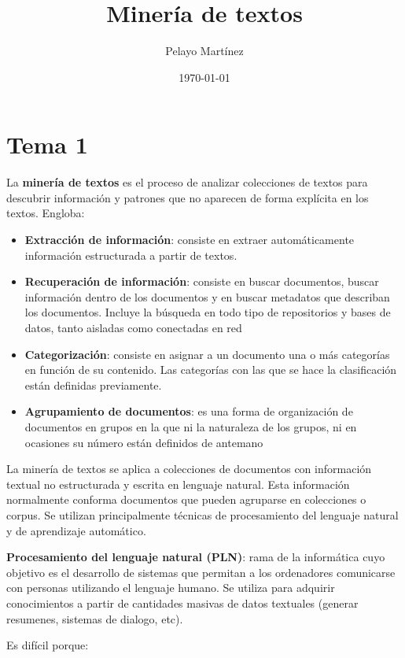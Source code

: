 \documentclass{ctexart}
\title{Minería de textos} %
\author{Pelayo Martínez} %
\date{\today} %
\begin{document}

	\maketitle %
    
	\section{Tema 1}
    La \textbf{minería de textos} es el proceso de analizar colecciones de textos para descubrir información y patrones que no aparecen de forma explícita en los textos.
    Engloba: 
	\begin{itemize}
	\item   \textbf{Extracción de información}: consiste en extraer automáticamente información estructurada a partir de textos.
	\item   \textbf{Recuperación de información}: consiste en buscar documentos, buscar información dentro de los documentos y en buscar metadatos que describan los documentos. Incluye la búsqueda en todo tipo de repositorios y bases de datos, tanto aisladas como conectadas en red
	\item   \textbf{Categorización}: consiste en asignar a un documento una o más categorías en función de su contenido. Las categorías con las que se hace la clasificación están definidas previamente.
	\item   \textbf{Agrupamiento de documentos}: es una forma de organización de documentos en grupos en la que ni la naturaleza de los grupos, ni en ocasiones su número están definidos de antemano
	\end{itemize}
		
	\begin{flushleft}
	La minería de textos se aplica a colecciones de documentos con información textual no estructurada y escrita en lenguaje natural. Esta información normalmente conforma documentos que pueden agruparse en colecciones o corpus.  Se utilizan principalmente técnicas de procesamiento del lenguaje natural y de aprendizaje automático.
	\end{flushleft}
	\begin{flushleft}
	\textbf{Procesamiento del lenguaje natural (PLN)}: rama de la informática cuyo objetivo es el desarrollo de sistemas que permitan a los ordenadores comunicarse con personas utilizando el lenguaje humano. Se utiliza para adquirir conocimientos a partir de cantidades masivas de datos textuales (generar resumenes, sistemas de dialogo, etc). 
	\end{flushleft}
	Es difícil porque:
\end{document}
